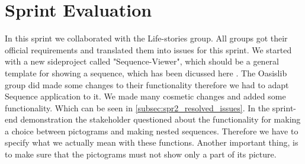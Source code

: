 \section{Sprint Evaluation}\label{sec:spr2_spreval}
In this sprint we collaborated with the Life-stories group.
All groups got their official requirements and translated them into issues for this sprint.
We started with a new sideproject called "Sequence-Viewer", which should be a general template for showing a sequence, which has been dicussed here .
The Oasislib group did made some changes to their functionality therefore we had to adapt Sequence application to it.
We made many cosmetic changes and added some functionality. Which can be seen in \ref{subsec:spr2_resolved_issues}.
In the sprint-end demonstration the stakeholder questioned about the functionality for making a choice between pictograms and making nested sequences.
Therefore we have to specify what we actually mean with these functions.
Another important thing, is to make sure that the pictograms must not show only a part of its picture.
